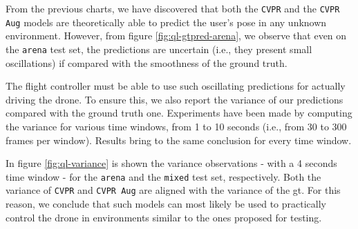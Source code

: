 From the previous charts, we have discovered that both the \texttt{CVPR} and the \texttt{CVPR Aug} models are theoretically able to predict the user's pose in any unknown environment. However, from figure \ref{fig:ql-gtpred-arena}, we observe that even on the \texttt{arena} test set, the predictions are uncertain (i.e., they present small oscillations) if compared with the smoothness of the ground truth.

The flight controller must be able to use such oscillating predictions for actually driving the drone. To ensure this, we also report the variance of our predictions compared with the ground truth one. Experiments have been made by computing the variance for various time windows, from 1 to 10 seconds (i.e., from 30 to 300 frames per window). Results bring to the same conclusion for every time window.

In figure \ref{fig:ql-variance} is shown the variance observations - with a 4 seconds time window - for the \texttt{arena} and the \texttt{mixed} test set, respectively. Both the variance of \texttt{CVPR} and \texttt{CVPR Aug} are aligned with the variance of the \gls{gt}. For this reason, we conclude that such models can most likely be used to practically control the drone in environments similar to the ones proposed for testing.

